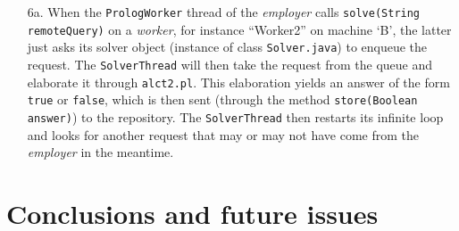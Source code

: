 \documentclass[a4paper, 11pt, oneside]{duthesis}
\begin{document}
\begin{enumerate}
\item[6a.]When the \texttt{PrologWorker} thread of the \emph{employer} calls \texttt{solve(String remoteQuery)} on a \emph{worker}, for instance ``Worker2'' on machine `B', the latter just asks its solver object (instance of class \texttt{Solver.java}) to enqueue the request.
The \texttt{SolverThread} will then take the request from the queue and elaborate it through \texttt{alct2.pl}.
This elaboration yields an answer of the form \texttt{true} or \texttt{false}, which is then sent (through the method \texttt{store(Boolean answer)}) to the repository. The \texttt{SolverThread} then restarts its infinite loop and looks for another request that may or may not have come from the \emph{employer} in the meantime.
\end{enumerate}


\chapter{Conclusions and future issues}

% 









\newpage



\end{document}
